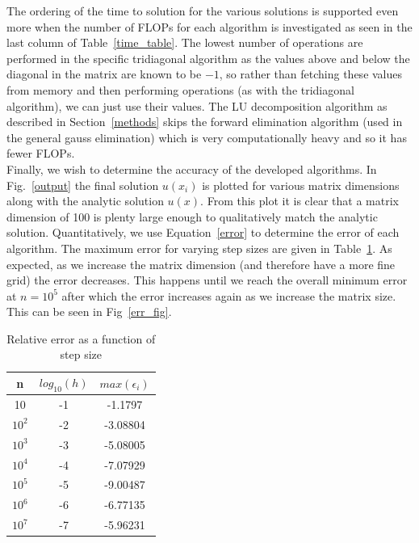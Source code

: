 \documentclass[prc,amsmath,twocolumn,superscriptaddress]{revtex4}
\begin{document}
The ordering of the time to solution for the various solutions is supported even more when the number of FLOPs for each algorithm is investigated as seen in the last column of Table~\ref{time_table}. The lowest number of operations are performed in the specific tridiagonal algorithm as the values above and below the diagonal in the matrix are known to be $-1$, so rather than fetching these values from memory and then performing operations (as with the tridiagonal algorithm), we can just use their values. The LU decomposition algorithm as described in Section~\ref{methods} skips the forward elimination algorithm (used in the general gauss elimination) which is very computationally heavy and so it has fewer FLOPs. \\


Finally, we wish to determine the accuracy of the developed algorithms. In Fig.~\ref{output} the final solution $u(x_i)$ is plotted for various matrix dimensions along with the analytic solution $u(x)$. From this plot it is clear that a matrix dimension of 100 is plenty large enough to qualitatively match the analytic solution. Quantitatively, we use Equation~\ref{error} to determine the error of each algorithm. The maximum error for varying step sizes are given in Table~\ref{err_table}. As expected, as we increase the matrix dimension (and therefore have a more fine grid) the error decreases. This happens until we reach the overall minimum error at $n=10^5$ after which the error increases again as we increase the matrix size. This can be seen in Fig~\ref{err_fig}.

\begin{table}[t]
\centering
\begin{tabular}{|c|c|c|}
\hline
n&$log_{10}(h)$ & $max(\epsilon_i)$\\
\hline
10&-1&-1.1797\\
$10^2$&-2&-3.08804\\
$10^3$&-3&-5.08005\\
$10^4$&-4&-7.07929\\
$10^5$&-5&-9.00487\\
$10^6$&-6&-6.77135\\
$10^7$&-7&-5.96231\\
\hline
\end{tabular}
\caption{Relative error as a function of step size}
\label{err_table}
\end{table}
\end{document}
